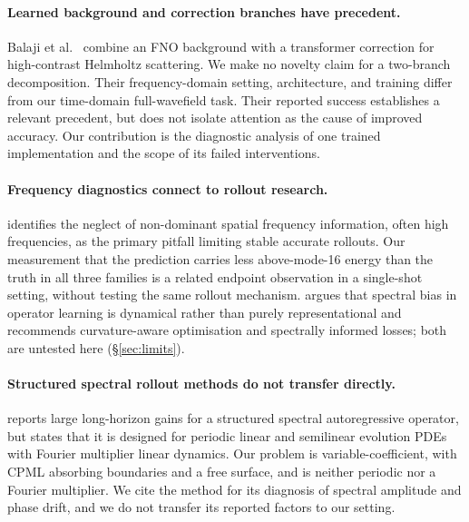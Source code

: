 \documentclass[11pt,a4paper]{article}
\begin{document}
\paragraph{Learned background and correction branches have precedent.}
Balaji et al.~\cite{highcontrast} combine an FNO background with a transformer correction for
high-contrast Helmholtz scattering. We make no novelty claim for a two-branch decomposition.
Their frequency-domain setting, architecture, and training differ from our time-domain
full-wavefield task. Their reported success establishes a relevant precedent, but does not
isolate attention as the cause of improved accuracy. Our contribution is the diagnostic
analysis of one trained implementation and the scope of its failed interventions.

\paragraph{Frequency diagnostics connect to rollout research.}
\cite{pderefiner} identifies the neglect of non-dominant spatial frequency information, often
high frequencies, as the primary pitfall limiting stable accurate rollouts. Our measurement
that the prediction carries less above-mode-16 energy than the truth in all three families is
a related endpoint observation in a single-shot setting, without testing the same rollout
mechanism. \cite{spectralbias} argues that spectral bias in operator learning is dynamical rather
than purely representational and recommends curvature-aware optimisation and spectrally
informed losses; both are untested here (\S\ref{sec:limits}).

\paragraph{Structured spectral rollout methods do not transfer directly.}
\cite{sgno} reports large long-horizon gains for a structured spectral autoregressive operator,
but states that it is designed for periodic linear and semilinear evolution PDEs with Fourier
multiplier linear dynamics. Our problem is variable-coefficient, with CPML absorbing boundaries
and a free surface, and is neither periodic nor a Fourier multiplier. We cite the method for
its diagnosis of spectral amplitude and phase drift, and we do not transfer its reported
factors to our setting.
\end{document}
